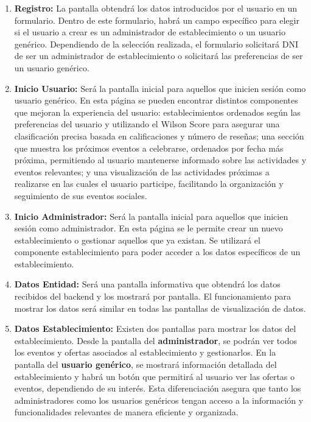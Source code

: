 \begin{enumerate}
    \item \textbf{Registro: } La pantalla obtendrá los datos introducidos por el usuario en un formulario. Dentro de este formulario, habrá un campo específico para elegir si el usuario a crear es un administrador de establecimiento o un usuario genérico. Dependiendo de la selección realizada, el formulario solicitará DNI de ser un administrador de establecimiento o solicitará las preferencias de ser un usuario genérico.
    \item \textbf{Inicio Usuario: } Será la pantalla inicial para aquellos que inicien sesión como usuario genérico. En esta página se pueden encontrar distintos componentes que mejoran la experiencia del usuario: establecimientos ordenados según las preferencias del usuario y utilizando el Wilson Score para asegurar una clasificación precisa basada en calificaciones y número de reseñas; una sección que muestra los próximos eventos a celebrarse, ordenados por fecha más próxima, permitiendo al usuario mantenerse informado sobre las actividades y eventos relevantes; y una visualización de las actividades próximas a realizarse en las cuales el usuario participe, facilitando la organización y seguimiento de sus eventos sociales.
    \item \textbf{Inicio Administrador: } Será la pantalla inicial para aquellos que inicien sesión como administrador. En esta página se le permite crear un nuevo establecimiento o gestionar aquellos que ya existan. Se utilizará el componente establecimiento para poder acceder a los datos específicos de un establecimiento.
    \item \textbf{Datos Entidad: } Será una pantalla informativa que obtendrá los datos recibidos del backend y los mostrará por pantalla. El funcionamiento para mostrar los datos será similar en todas las pantallas de visualización de datos.
    \item \textbf{Datos Establecimiento: } Existen dos pantallas para mostrar los datos del establecimiento. Desde la pantalla del \textbf{administrador}, se podrán ver todos los eventos y ofertas asociados al establecimiento y gestionarlos. En la pantalla del \textbf{usuario genérico}, se mostrará información detallada del establecimiento y habrá un botón que permitirá al usuario ver las ofertas o eventos, dependiendo de su interés. Esta diferenciación asegura que tanto los administradores como los usuarios genéricos tengan acceso a la información y funcionalidades relevantes de manera eficiente y organizada.
\end{enumerate}

